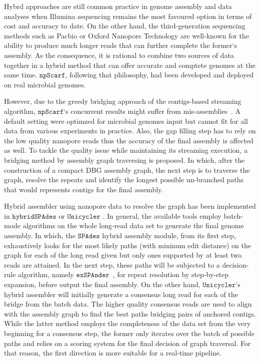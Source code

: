 \documentclass[10pt,twocolumn,twoside]{genpaper}
\newcommand{\npscarf}{$\mathtt{npScarf}$}
\newcommand{\unicycler}{$\mathtt{Unicycler}$}
\newcommand{\spades}{$\mathtt{SPAdes}$}
\begin{document}
Hybrd approaches are still common practice in genome assembly and data analyses when Illumina sequencing remains the most favoured option in terms of cost and accuracy to date.
On the other hand, the third-generation sequencing methods such as Pacbio or Oxford Nanopore Technology are well-known for the ability to produce much longer reads that can further complete the former`s assembly.
As the consequence, it is rational to combine two sources of data together in a hybrid method that can offer accurate and comptete genomes at the same time.
\npscarf{}, following that philosophy, had been developed and deployed on real microbial genomes.

However, due to the greedy bridging approach of the contigs-based streaming algorithm, \npscarf{}`s concurrent results might suffer from mis-assemblies~\cite{Wick2017unicycler,Giordano2017}. 
A default setting were optimzed for microbial genomes input but cannot fit for all data from various experiments in practice.
Also, the gap filling step has to rely on the low quality nanopore reads thus the accuracy of the final assembly is affected as well. 
To tackle the quality issue while maintaining its streaming execution, a bridging method by assembly graph traversing is proposed. 
In which, after the construction of a compact DBG assembly graph, the next step is to traverse the graph, resolve the repeats and identify the longest possible un-branched paths that would represents contigs for the final assembly.

Hybrid assembler using nanopore data to resolve the graph has been implemented in $\mathtt{hybridSPAdes}$ \cite{AntipovKM2015} or \unicycler{} \cite{Wick2017unicycler}. 
In general, the available tools employ batch-mode algorithms on the whole long-read data set to generate the final genome assembly. 
In which, the \spades{} hybrid assembly module, from its first step, exhaustively looks for the most likely paths (with mininum edit distance) on the graph for each of the long read given but only ones supported by at least two reads are attained. In the next step, these paths will be subjected to a decision-rule algorithm, namely $\mathtt{exSPAnder}$~\cite{Prjibelski2014}, for repeat resolution by step-by-step expansion, before output the final assembly.
On the other hand, \unicycler{}'s hybrid assembler will initially generate a consensus long read for each of the bridge from the batch data. 
The higher quality consensus reads are used to align with the assembly graph to find the best paths bridging pairs of anchored contigs.
While the latter method employs the completeness of the data  set from the very beginning for a consensus step, the former only iterates over the batch of possible paths and relies on a scoring system for the final decision of graph traversal. For that reason, the first direction is more suitable for a real-time pipeline.
    
\end{document}
